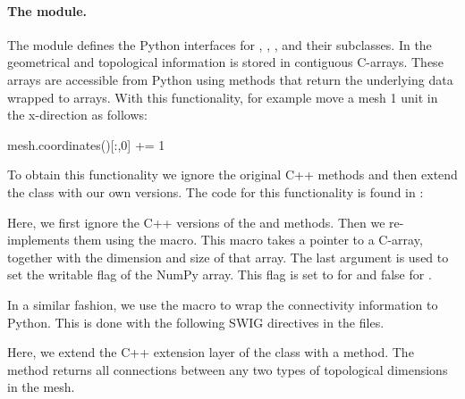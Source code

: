 \paragraph{The  module.}
The  module defines the Python interfaces for ,
, , and their subclasses. In
 the geometrical and topological information is stored in
contiguous C-arrays. These arrays are accessible from Python using
methods that return the underlying data wrapped to \numpy arrays. With
this functionality, for example move a mesh 1 unit in the
x-direction as follows:
\begin{python}
mesh.coordinates()[:,0] += 1
\end{python}
To obtain this functionality we ignore the original C++ methods and
then extend the  class with our own versions. The code for
this functionality is found in :
Here, we first ignore the C++ versions of the  and
 methods. Then we re-implements them using the
 macro. This macro takes a pointer to a
C-array, together with the dimension and size of that array. The last
argument is used to set the writable flag of the NumPy array. This
flag is set to  for  and false for
.

In a similar fashion, we use the  macro to wrap
the connectivity information to Python. This is done with the
following SWIG directives in the  files.
Here, we extend the C++ extension layer of the
 class with a 
method. The method returns all connections between any two types of
topological dimensions in the mesh.

